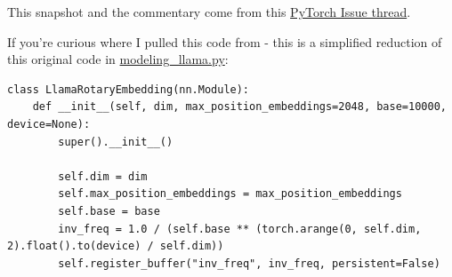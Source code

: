 \documentclass[
]{report}
\begin{document}
This snapshot and the commentary come from this
\href{https://github.com/pytorch/pytorch/issues/84936\#issuecomment-1246084645}{PyTorch
Issue thread}.

If you're curious where I pulled this code from - this is a simplified
reduction of this original code in
\href{https://github.com/huggingface/transformers/blob/3f69f415adcbdaedec154ba8eac220ef3276975d/src/transformers/models/llama/modeling_llama.py\#L130}{modeling\_llama.py}:

\begin{verbatim}
class LlamaRotaryEmbedding(nn.Module):
    def __init__(self, dim, max_position_embeddings=2048, base=10000, device=None):
        super().__init__()

        self.dim = dim
        self.max_position_embeddings = max_position_embeddings
        self.base = base
        inv_freq = 1.0 / (self.base ** (torch.arange(0, self.dim, 2).float().to(device) / self.dim))
        self.register_buffer("inv_freq", inv_freq, persistent=False)
\end{verbatim}
\end{document}

